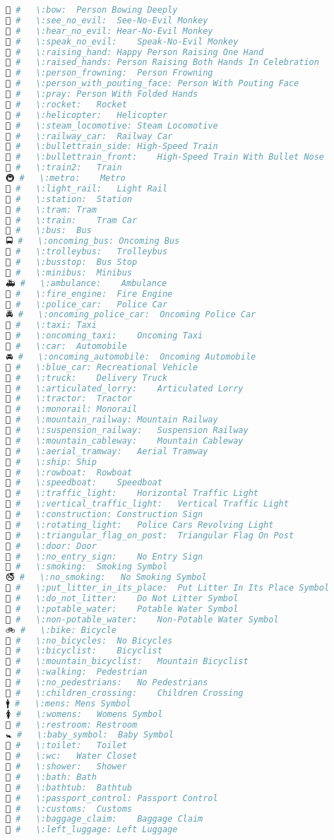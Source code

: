 \begin{lstlisting}[language=Julia, style=julia]
🙇 #   \:bow:  Person Bowing Deeply
🙈 #   \:see_no_evil:  See-No-Evil Monkey
🙉 #   \:hear_no_evil: Hear-No-Evil Monkey
🙊 #   \:speak_no_evil:    Speak-No-Evil Monkey
🙋 #   \:raising_hand: Happy Person Raising One Hand
🙌 #   \:raised_hands: Person Raising Both Hands In Celebration
🙍 #   \:person_frowning:  Person Frowning
🙎 #   \:person_with_pouting_face: Person With Pouting Face
🙏 #   \:pray: Person With Folded Hands
🚀 #   \:rocket:   Rocket
🚁 #   \:helicopter:   Helicopter
🚂 #   \:steam_locomotive: Steam Locomotive
🚃 #   \:railway_car:  Railway Car
🚄 #   \:bullettrain_side: High-Speed Train
🚅 #   \:bullettrain_front:    High-Speed Train With Bullet Nose
🚆 #   \:train2:   Train
🚇 #   \:metro:    Metro
🚈 #   \:light_rail:   Light Rail
🚉 #   \:station:  Station
🚊 #   \:tram: Tram
🚋 #   \:train:    Tram Car
🚌 #   \:bus:  Bus
🚍 #   \:oncoming_bus: Oncoming Bus
🚎 #   \:trolleybus:   Trolleybus
🚏 #   \:busstop:  Bus Stop
🚐 #   \:minibus:  Minibus
🚑 #   \:ambulance:    Ambulance
🚒 #   \:fire_engine:  Fire Engine
🚓 #   \:police_car:   Police Car
🚔 #   \:oncoming_police_car:  Oncoming Police Car
🚕 #   \:taxi: Taxi
🚖 #   \:oncoming_taxi:    Oncoming Taxi
🚗 #   \:car:  Automobile
🚘 #   \:oncoming_automobile:  Oncoming Automobile
🚙 #   \:blue_car: Recreational Vehicle
🚚 #   \:truck:    Delivery Truck
🚛 #   \:articulated_lorry:    Articulated Lorry
🚜 #   \:tractor:  Tractor
🚝 #   \:monorail: Monorail
🚞 #   \:mountain_railway: Mountain Railway
🚟 #   \:suspension_railway:   Suspension Railway
🚠 #   \:mountain_cableway:    Mountain Cableway
🚡 #   \:aerial_tramway:   Aerial Tramway
🚢 #   \:ship: Ship
🚣 #   \:rowboat:  Rowboat
🚤 #   \:speedboat:    Speedboat
🚥 #   \:traffic_light:    Horizontal Traffic Light
🚦 #   \:vertical_traffic_light:   Vertical Traffic Light
🚧 #   \:construction: Construction Sign
🚨 #   \:rotating_light:   Police Cars Revolving Light
🚩 #   \:triangular_flag_on_post:  Triangular Flag On Post
🚪 #   \:door: Door
🚫 #   \:no_entry_sign:    No Entry Sign
🚬 #   \:smoking:  Smoking Symbol
🚭 #   \:no_smoking:   No Smoking Symbol
🚮 #   \:put_litter_in_its_place:  Put Litter In Its Place Symbol
🚯 #   \:do_not_litter:    Do Not Litter Symbol
🚰 #   \:potable_water:    Potable Water Symbol
🚱 #   \:non-potable_water:    Non-Potable Water Symbol
🚲 #   \:bike: Bicycle
🚳 #   \:no_bicycles:  No Bicycles
🚴 #   \:bicyclist:    Bicyclist
🚵 #   \:mountain_bicyclist:   Mountain Bicyclist
🚶 #   \:walking:  Pedestrian
🚷 #   \:no_pedestrians:   No Pedestrians
🚸 #   \:children_crossing:    Children Crossing
🚹 #   \:mens: Mens Symbol
🚺 #   \:womens:   Womens Symbol
🚻 #   \:restroom: Restroom
🚼 #   \:baby_symbol:  Baby Symbol
🚽 #   \:toilet:   Toilet
🚾 #   \:wc:   Water Closet
🚿 #   \:shower:   Shower
🛀 #   \:bath: Bath
🛁 #   \:bathtub:  Bathtub
🛂 #   \:passport_control: Passport Control
🛃 #   \:customs:  Customs
🛄 #   \:baggage_claim:    Baggage Claim
🛅 #   \:left_luggage: Left Luggage
\end{lstlisting}
